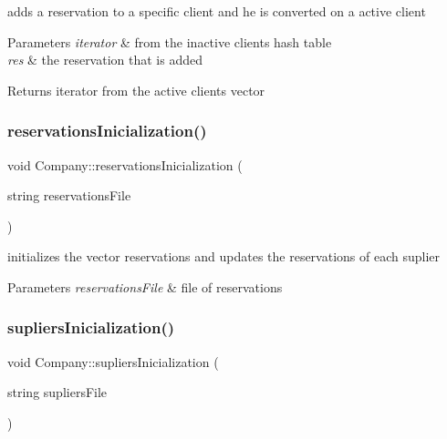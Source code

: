 adds a reservation to a specific client and he is converted on a active client 


\begin{DoxyParams}{Parameters}
{\em iterator} & from the inactive clients hash table\\
\hline
{\em res} & the reservation that is added\\
\hline
\end{DoxyParams}
\begin{DoxyReturn}{Returns}
iterator from the active clients vector 
\end{DoxyReturn}
\hypertarget{class_company_a79bf900155922f7d8b8b1f248dcc3313}{}\label{class_company_a79bf900155922f7d8b8b1f248dcc3313} 
\subsubsection{\texorpdfstring{reservations\+Inicialization()}{reservationsInicialization()}}
{\footnotesize\ttfamily void Company\+::reservations\+Inicialization (\begin{DoxyParamCaption}\item[{string}]{reservations\+File }\end{DoxyParamCaption})}



initializes the vector reservations and updates the reservations of each suplier 


\begin{DoxyParams}{Parameters}
{\em reservations\+File} & file of reservations \\
\hline
\end{DoxyParams}
\hypertarget{class_company_a5a3e5d5ef3ef991c54de2781d0607c19}{}\label{class_company_a5a3e5d5ef3ef991c54de2781d0607c19} 
\subsubsection{\texorpdfstring{supliers\+Inicialization()}{supliersInicialization()}}
{\footnotesize\ttfamily void Company\+::supliers\+Inicialization (\begin{DoxyParamCaption}\item[{string}]{supliers\+File }\end{DoxyParamCaption})}




